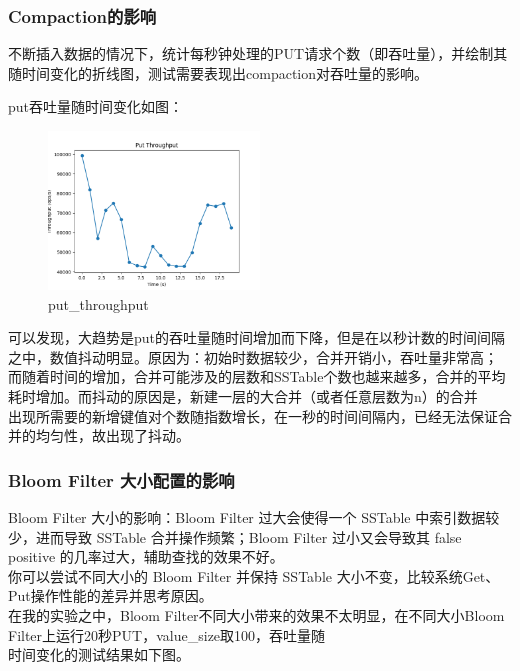 \documentclass[fontset=none]{article}
\begin{document}
\subsubsection{Compaction的影响}
不断插入数据的情况下，统计每秒钟处理的PUT请求个数（即吞吐量），并绘制其随时间变化的折线图，测试需要表现出compaction对吞吐量的影响。

put吞吐量随时间变化如图：

\begin{figure}[h!]
    \centering
    \includegraphics[width=0.5\textwidth]{../imgs/put_plot_test/put_plot_8KB.png}
    \caption{put_throughput}\label{fig:put_throughput}
\end{figure}
可以发现，大趋势是put的吞吐量随时间增加而下降，但是在以秒计数的时间间隔之中，数值抖动明显。原因为：初始时数据较少，合并开销小，吞吐量非常高；\\
而随着时间的增加，合并可能涉及的层数和SSTable个数也越来越多，合并的平均耗时增加。而抖动的原因是，新建一层的大合并（或者任意层数为n）的合并\\
出现所需要的新增键值对个数随指数增长，在一秒的时间间隔内，已经无法保证合并的均匀性，故出现了抖动。



\subsubsection{Bloom Filter 大小配置的影响}

Bloom Filter 大小的影响：Bloom Filter 过大会使得一个 SSTable 中索引数据较少，进而导致 SSTable 合并操作频繁；Bloom Filter 过小又会导致其 false positive 的几率过大，辅助查找的效果不好。\\
你可以尝试不同大小的 Bloom Filter 并保持 SSTable 大小不变，比较系统Get、Put操作性能的差异并思考原因。\\
在我的实验之中，Bloom Filter不同大小带来的效果不太明显，在不同大小Bloom Filter上运行20秒PUT，value_size取100，吞吐量随\\
时间变化的测试结果如下图。
\end{document}
